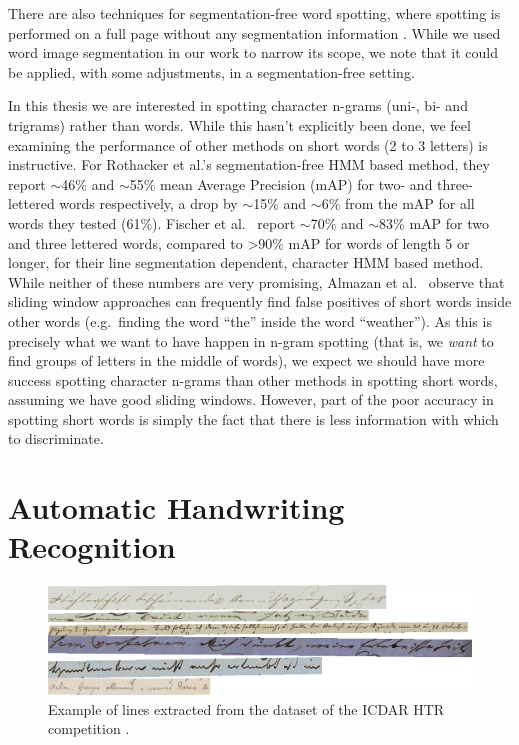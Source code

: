 \documentclass[ms,electronic,twosidetoc,letterpaper,chaptercenter,parttop,lof,lot]{byumsphd}
\begin{document}
There are also techniques for segmentation-free word spotting, where spotting is performed on a full page without any segmentation information \cite{wilkinson2017}. While we used word image segmentation in our work to narrow its scope, we note that it could be applied, with some adjustments, in a segmentation-free setting.

In this thesis we are interested in spotting character n-grams (uni-, bi- and trigrams) rather than words. While this hasn't explicitly been done, we feel examining the performance of other methods on short words (2 to 3 letters) is instructive. For Rothacker et al.'s \cite{Rothacker2013} segmentation-free HMM based method, they report $\sim$46\% and $\sim$55\% mean Average Precision (mAP) for two- and three-lettered words respectively, a drop by $\sim$15\% and $\sim$6\% from the mAP for all words they tested (61\%). Fischer et al.~\cite{Fischer2012} report $\sim$70\% and $\sim$83\% mAP for two and three lettered words, compared to {\textgreater}90\% mAP for words of length 5 or longer, for their line segmentation dependent, character HMM based method. While neither of these numbers are very promising, Almazan et al.~\cite{Almazan2012} observe that sliding window approaches can frequently find false positives of short words inside other words (e.g.~finding the word ``the'' inside the word ``weather''). As this is precisely what we want to have happen in n-gram spotting (that is, we \textit{want} to find groups of letters in the middle of words), we expect we should have more success spotting character n-grams than other methods in spotting short words, assuming we have good sliding windows. However, part of the poor accuracy in spotting short words is simply the fact that there is less information with which to discriminate.%


\section{Automatic Handwriting Recognition}

\begin{figure}[b]
    \centering
    \includegraphics[width=.98\textwidth]{german_lines}
    \caption{Example of lines extracted from the dataset of the ICDAR HTR competition \cite{icdarComp2017}.}
    \label{fig:germanlines}
\end{figure}
\end{document}
